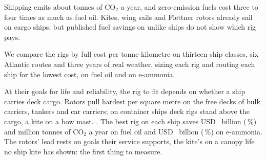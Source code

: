 Shipping emits about  tonnes of CO$_2$ a year, and zero-emission fuels cost three to four times as much as fuel oil. Kites, wing sails and Flettner rotors already sail on cargo ships, but published fuel savings on unlike ships do not show which rig pays.

We compare the rigs by full cost per tonne-kilometre on thirteen ship classes, six Atlantic routes and three years of real weather, sizing each rig and routing each ship for the lowest cost, on fuel oil and on e-ammonia.

At their goals for life and reliability, the rig to fit depends on whether a ship carries deck cargo. Rotors pull hardest per square metre on the free decks of bulk carriers, tankers and car carriers; on container ships deck rigs stand above the cargo, a kite on a bow mast.  \NumTrailingSummary{}. The best rig on each ship saves USD~\NumFleetSavedOil{} billion (\NumFleetSavedShareOil\,\%) and \NumFleetCarbonOil{} million tonnes of CO$_2$ a year on fuel oil and USD~\NumFleetSavedAmmonia{} billion (\NumFleetSavedShareAmmonia\,\%) on e-ammonia. The rotors' lead rests on goals their service supports, the kite's on a canopy life no ship kite has shown: the first thing to measure.
